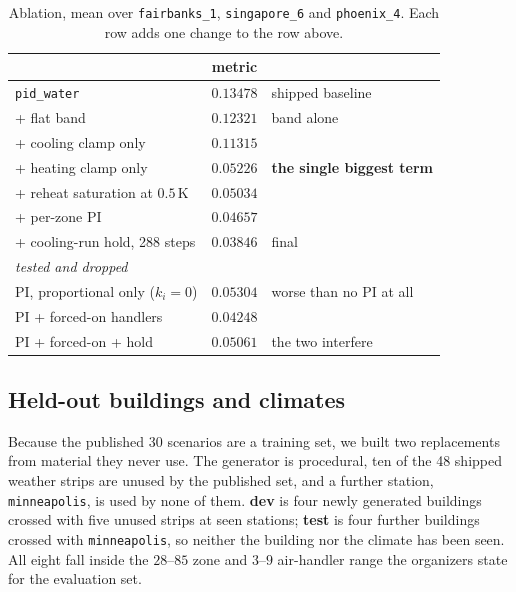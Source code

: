 \documentclass[10pt]{article}
\begin{document}
\begin{table}[h]
\centering
\caption{Ablation, mean over \texttt{fairbanks\_1}, \texttt{singapore\_6} and
\texttt{phoenix\_4}. Each row adds one change to the row above.}
\begin{tabular}{lcl}
\toprule
 & metric & \\
\midrule
\texttt{pid\_water}                     & $0.13478$ & shipped baseline \\
\quad + flat band                       & $0.12321$ & band alone \\
\quad + cooling clamp only              & $0.11315$ & \\
\quad + heating clamp only              & $0.05226$ & \textbf{the single biggest term} \\
\quad + reheat saturation at $0.5$\,K   & $0.05034$ & \\
\quad + per-zone PI                     & $0.04657$ & \\
\quad + cooling-run hold, 288 steps     & $\mathbf{0.03846}$ & final \\
\midrule
\multicolumn{3}{l}{\emph{tested and dropped}} \\
\quad PI, proportional only ($k_i=0$)   & $0.05304$ & worse than no PI at all \\
\quad PI + forced-on handlers           & $0.04248$ & \\
\quad PI + forced-on + hold             & $0.05061$ & the two interfere \\
\bottomrule
\end{tabular}
\label{tab:ablation}
\end{table}

\subsection{Held-out buildings and climates}

Because the published 30 scenarios are a training set, we built two
replacements from material they never use. The generator is procedural, ten of
the 48 shipped weather strips are unused by the published set, and a further
station, \texttt{minneapolis}, is used by none of them. \textbf{dev} is four
newly generated buildings crossed with five unused strips at seen stations;
\textbf{test} is four further buildings crossed with \texttt{minneapolis}, so
neither the building nor the climate has been seen. All eight fall inside the
$28$--$85$ zone and $3$--$9$ air-handler range the organizers state for the
evaluation set.
\end{document}
